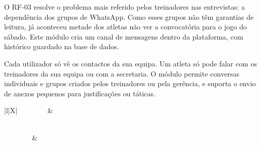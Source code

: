 O RF-03 resolve o problema mais referido pelos treinadores nas entrevistas: a dependência dos grupos de WhatsApp. Como esses grupos não têm garantias de leitura, já aconteceu metade dos atletas não ver a convocatória para o jogo do sábado. Este módulo cria um canal de mensagens dentro da plataforma, com histórico guardado na base de dados.

Cada utilizador só vê os contactos da sua equipa. Um atleta só pode falar com os treinadores da sua equipa ou com a secretaria. O módulo permite conversas individuais e grupos criados pelos treinadores ou pela gerência, e suporta o envio de anexos pequenos para justificações ou táticas.

{\small
{}
\begin{xltabular}{\textwidth}{|l|X|}
\hline
{}\textcolor{white}{\textbf{Campo}} & \textcolor{white}{\textbf{Descrição}} \\ \hline
\endfirsthead

 \\
\hline
{}\textcolor{white}{\textbf{Campo}} & \textcolor{white}{\textbf{Descrição}} \\ \hline
\endhead

\hline {} \\ \hline \endfoot

\hline
\caption{Especificação do Requisito Funcional: RF-03}
\label{tab:rf-03} \\
\endlastfoot


\end{xltabular}}
